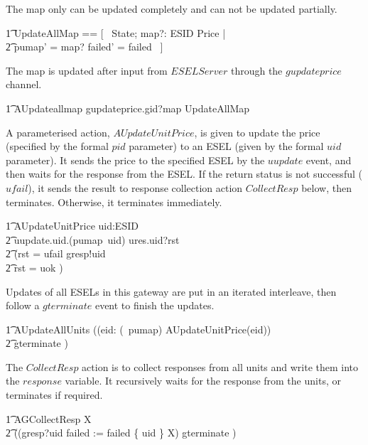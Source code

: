 The map only can be updated completely and can not be updated partially.
\begin{zed}
        \t1 UpdateAllMap == [~ \Delta State; map?: ESID \pfun Price | \\
            \t2 pumap' = map? \land failed' = failed ~] 
\end{zed}

The map is updated after input from $ESELServer$ through the $gupdateprice$ channel.
\begin{circusaction}
        \t1 AUpdateallmap \circdef gupdateprice.gid?map \then \lschexpract UpdateAllMap \rschexpract \\
\end{circusaction}

A parameterised action, $AUpdateUnitPrice$, is given to update the price (specified by the formal $pid$ parameter) to an ESEL (given by the formal $uid$ parameter). It sends the price to the specified ESEL by the $uupdate$ event, and then waits for the response from the ESEL. If the return status is not successful ($ufail$), it sends the result to response collection action $CollectResp$ below, then terminates. Otherwise, it terminates immediately.
\begin{circusaction}
        \t1 AUpdateUnitPrice \circdef uid:ESID \circspot \\
            \t2 uupdate.uid.(pumap~uid) \then ures.uid?rst \then \\
            \t2 (\lcircguard rst = ufail \rcircguard \circguard gresp!uid \then \Skip \\
            \t2 \extchoice \lcircguard rst = uok \rcircguard \circguard \Skip)\\
\end{circusaction}

Updates of all ESELs in this gateway are put in an iterated interleave, then follow a $gterminate$ event to finish the updates.
\begin{circusaction}
        \t1 AUpdateAllUnits \circdef ((\Interleave eid: (\dom~pumap) \linter \emptyset \rinter \circspot AUpdateUnitPrice(eid)) \\
        \t2 \circseq gterminate \then \Skip) \\
\end{circusaction}

The $CollectResp$ action is to collect responses from all units and write them into the $response$ variable. It recursively waits for the response from the units, or terminates if required.
\begin{circusaction}
        \t1 AGCollectResp \circdef \circmu X \circspot \\
            \t2 ((gresp?uid \then failed := failed \cup \{ uid \} \circseq X) \extchoice gterminate \then \Skip) \\
\end{circusaction}

